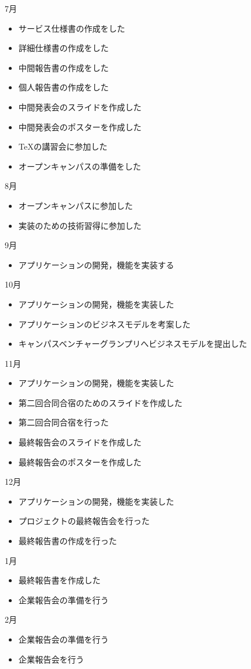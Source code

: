 7月
\begin{itemize}
\item サービス仕様書の作成をした
\item 詳細仕様書の作成をした
\item 中間報告書の作成をした
\item 個人報告書の作成をした
\item 中間発表会のスライドを作成した
\item 中間発表会のポスターを作成した
\item TeXの講習会に参加した
\item オープンキャンパスの準備をした
\end{itemize}
8月
\begin{itemize}
\item オープンキャンパスに参加した
\item 実装のための技術習得に参加した
\end{itemize}
9月
\begin{itemize}
\item アプリケーションの開発，機能を実装する
\end{itemize}
10月
\begin{itemize}
\item アプリケーションの開発，機能を実装した
\item アプリケーションのビジネスモデルを考案した
\item キャンパスベンチャーグランプリへビジネスモデルを提出した
\end{itemize}
11月
\begin{itemize}
\item アプリケーションの開発，機能を実装した
\item 第二回合同合宿のためのスライドを作成した
\item 第二回合同合宿を行った
\item 最終報告会のスライドを作成した
\item 最終報告会のポスターを作成した
\end{itemize}
12月
\begin{itemize}
\item アプリケーションの開発，機能を実装した
\item プロジェクトの最終報告会を行った
\item 最終報告書の作成を行った
\end{itemize}
1月
\begin{itemize}
\item 最終報告書を作成した
\item 企業報告会の準備を行う
\end{itemize}
2月
\begin{itemize}
\item 企業報告会の準備を行う
\item 企業報告会を行う
\end{itemize}
